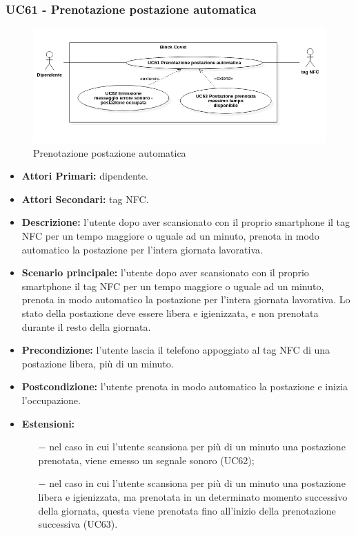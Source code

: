\subsubsection{ UC61 - Prenotazione postazione automatica}
\begin{figure}[H]
		\centering
		\includegraphics[width=18cm]{res/images/UC61-62-63.png}
		\caption{Prenotazione postazione automatica}
		\label{fig:Prenotazione postazione automatica}
	\end{figure}
\begin{itemize}
	\item\textbf{Attori Primari:} dipendente.
	\item\textbf{Attori Secondari:} tag NFC.
	\item\textbf{Descrizione:} l’utente dopo aver scansionato con il proprio smartphone il tag NFC per un tempo maggiore o uguale ad un minuto, prenota in modo automatico la postazione per l'intera giornata lavorativa. 
	\item\textbf{Scenario principale:} l’utente dopo aver scansionato con il proprio smartphone il tag NFC per un tempo maggiore o uguale ad un minuto, prenota in modo automatico la postazione per l'intera giornata lavorativa. Lo stato della postazione deve essere libera e igienizzata, e non prenotata durante il resto della giornata.
	\item\textbf{Precondizione:} l'utente lascia il telefono appoggiato al tag NFC di una postazione libera, più di un minuto.
	\item\textbf{Postcondizione:} l'utente prenota in modo automatico la postazione e inizia l'occupazione.
	\item\textbf{Estensioni:}
	\begin{itemize}
		\item[$-$] nel caso in cui l'utente scansiona per più di un minuto una postazione prenotata, viene emesso un segnale sonoro (UC62);
		\item[$-$] nel caso in cui l'utente scansiona per più di un minuto una postazione libera e igienizzata, ma prenotata in un determinato momento successivo della giornata, questa viene prenotata fino all'inizio della prenotazione successiva (UC63).
	\end{itemize}
\end{itemize}
